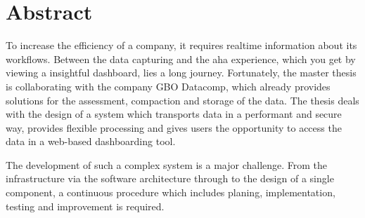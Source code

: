 \chapter*{Abstract}
\label{chap:abstract}

To increase the efficiency of a company, it requires realtime
information about its workflows. Between the data capturing
and the aha experience, which you get by viewing a 
insightful dashboard, lies a long journey. Fortunately,
the master thesis is collaborating with the company GBO Datacomp,
which already provides solutions for the assessment, compaction and
storage of the data. The thesis deals with the design of a system
which transports data in a performant and secure way, provides
flexible processing and gives users the opportunity to access
the data in a web-based dashboarding tool.

The development of such a complex system is a major challenge.
From the infrastructure via the software architecture through to
the design of a single component, a continuous procedure which includes
planing, implementation, testing and improvement is required.
